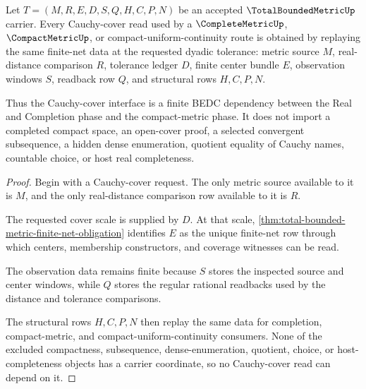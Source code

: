 \begin{theorem}
\label{thm:total-bounded-metric-cauchy-cover-obligation}
Let $T=(M,R,E,D,S,Q,H,C,P,N)$ be an accepted $\TotalBoundedMetricUp$ carrier. Every Cauchy-cover read used by a $\CompleteMetricUp$, $\CompactMetricUp$, or compact-uniform-continuity route is obtained by replaying the same finite-net data at the requested dyadic tolerance: metric source $M$, real-distance comparison $R$, tolerance ledger $D$, finite center bundle $E$, observation windows $S$, readback row $Q$, and structural rows $H,C,P,N$.

Thus the Cauchy-cover interface is a finite BEDC dependency between the Real and Completion phase and the compact-metric phase. It does not import a completed compact space, an open-cover proof, a selected convergent subsequence, a hidden dense enumeration, quotient equality of Cauchy names, countable choice, or host real completeness.
\end{theorem}
\begin{proof}
Begin with a Cauchy-cover request. The only metric source available to it is $M$, and the only real-distance comparison row available to it is $R$.

The requested cover scale is supplied by $D$. At that scale, \autoref{thm:total-bounded-metric-finite-net-obligation} identifies $E$ as the unique finite-net row through which centers, membership constructors, and coverage witnesses can be read.

The observation data remains finite because $S$ stores the inspected source and center windows, while $Q$ stores the regular rational readbacks used by the distance and tolerance comparisons.

The structural rows $H,C,P,N$ then replay the same data for completion, compact-metric, and compact-uniform-continuity consumers. None of the excluded compactness, subsequence, dense-enumeration, quotient, choice, or host-completeness objects has a carrier coordinate, so no Cauchy-cover read can depend on it.
\end{proof}

